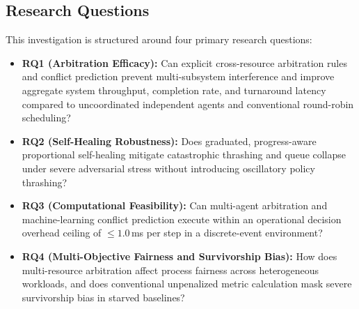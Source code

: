 \documentclass[conference]{IEEEtran}
\begin{document}
\subsection{Research Questions}
This investigation is structured around four primary research questions:
\begin{itemize}
    \item \textbf{RQ1 (Arbitration Efficacy):} Can explicit cross-resource arbitration rules and conflict prediction prevent multi-subsystem interference and improve aggregate system throughput, completion rate, and turnaround latency compared to uncoordinated independent agents and conventional round-robin scheduling?
    \item \textbf{RQ2 (Self-Healing Robustness):} Does graduated, progress-aware proportional self-healing mitigate catastrophic thrashing and queue collapse under severe adversarial stress without introducing oscillatory policy thrashing?
    \item \textbf{RQ3 (Computational Feasibility):} Can multi-agent arbitration and machine-learning conflict prediction execute within an operational decision overhead ceiling of $\le 1.0$\,ms per step in a discrete-event environment?
    \item \textbf{RQ4 (Multi-Objective Fairness and Survivorship Bias):} How does multi-resource arbitration affect process fairness across heterogeneous workloads, and does conventional unpenalized metric calculation mask severe survivorship bias in starved baselines?
\end{itemize}
\end{document}
